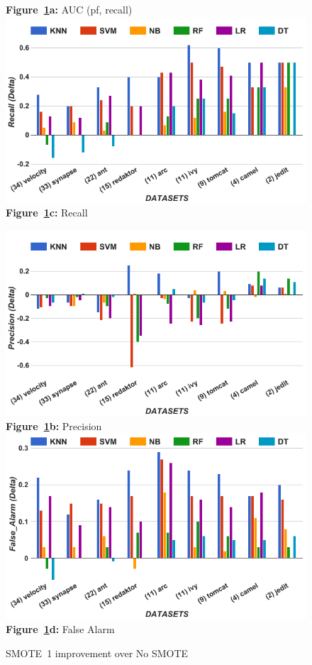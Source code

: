 \begin{figure}[!t]
\begin{minipage}{.5\linewidth}
  {\bf Figure~\ref{fig:untuned}a:} AUC (pf, recall)
        \includegraphics[width=\linewidth]{./fig/Recall_untuned.png}
  {\bf Figure~\ref{fig:untuned}c:} Recall
    \end{minipage}%
\begin{minipage}{.5\linewidth}
        \centering
        \includegraphics[width=\linewidth]{./fig/prec_untuned.png}
  {\bf Figure~\ref{fig:untuned}b:} Precision
        \includegraphics[width=\linewidth]{./fig/pf_untuned.png}
  {\bf Figure~\ref{fig:untuned}d:} False Alarm
    \end{minipage}%
    \caption{SMOTE~1 improvement over No SMOTE}
    \label{fig:untuned}
\end{figure}

